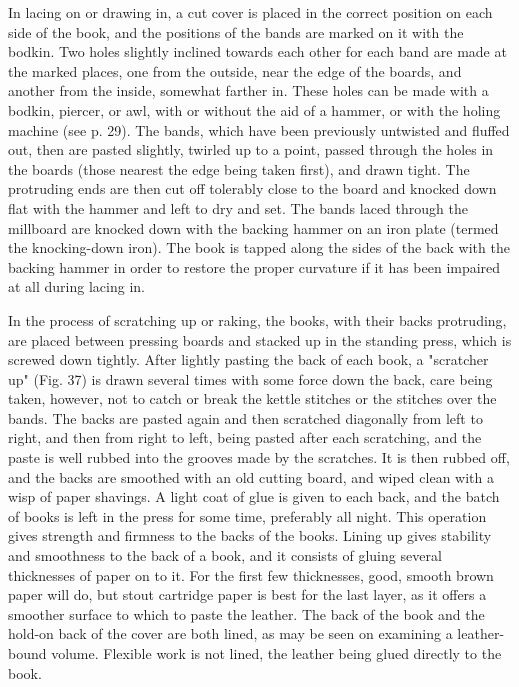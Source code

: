 \documentclass[twoside]{book}
\begin{document}
In lacing on or drawing in, a cut cover is placed
in the correct position on each side of the book,
and the positions of the bands are marked on it
with the bodkin. Two holes slightly inclined
towards each other for each band are made at the
marked places, one from the outside, near the edge
of the boards, and another from the inside, somewhat
\pagebreak
farther in. These holes can be made with a
bodkin, piercer, or awl, with or without the aid of a
hammer, or with the holing machine (see p. 29).
The bands, which have been previously untwisted
and fluffed out, then are pasted slightly, twirled up
to a point, passed through the holes in the boards
(those nearest the edge being taken first), and
drawn tight. The protruding ends are then cut off
tolerably close to the board and knocked down flat
with the hammer and left to dry and set. The bands
laced through the millboard are knocked down with
the backing hammer on an iron plate (termed the
knocking-down iron). The book is tapped along the
sides of the back with the backing hammer in order
to restore the proper curvature if it has been
impaired at all during lacing in.

In the process of scratching up or raking, the
books, with their backs protruding, are placed
between pressing boards and stacked up in the
standing press, which is screwed down tightly. After
lightly pasting the back of each book, a "scratcher
up" (Fig. 37) is drawn several times with some force
down the back, care being taken, however, not to
catch or break the kettle stitches or the stitches
over the bands. The backs are pasted again and
then scratched diagonally from left to right, and
then from right to left, being pasted after each
scratching, and the paste is well rubbed into the
grooves made by the scratches. It is then rubbed
off, and the backs are smoothed with an old cutting
board, and wiped clean with a wisp of paper shavings.
A light coat of glue is given to each back,
and the batch of books is left in the press for some
time, preferably all night. This operation gives
strength and firmness to the backs of the books.
Lining up gives stability and smoothness to the
back of a book, and it consists of gluing several
thicknesses of paper on to it. For the first few
thicknesses, good, smooth brown paper will do, but
\pagebreak
stout cartridge paper is best for the last layer, as
it offers a smoother surface to which to paste the
leather. The back of the book and the hold-on
back of the cover are both lined, as may be seen
on examining a leather-bound volume. Flexible
work is not lined, the leather being glued directly
to the book.
\end{document}
